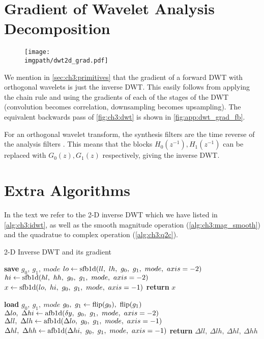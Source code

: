 \section{Gradient of Wavelet Analysis Decomposition}\label{sec:app:analysis_gradient}
\begin{figure}
  \centering
  \texttt{[image: \\imgpath/dwt2d\_grad.pdf]}
  \label{fig:app:dwt_grad_fb}
\end{figure}
We mention in \autoref{sec:ch3:primitives} that the gradient of a forward DWT with
orthogonal wavelets is just the inverse DWT. 
This easily follows from applying the chain rule and using the gradients of each of the
stages of the DWT (convolution becomes correlation, downsampling becomes
upsampling). The equivalent backwards pass of \autoref{fig:ch3:dwt} is
shown in \autoref{fig:app:dwt_grad_fb}.

For an orthogonal wavelet transform, the synthesis filters are the time reverse of
the analysis filters \cite[Chapter 3]{vetterli_wavelets_2007}. This means that
the blocks $H_0(z^{-1}), H_1(z^{-1})$ can be replaced with $G_0(z), G_1(z)$
respectively, giving the inverse DWT.

\section{Extra Algorithms}
In the text we refer to the 2-D inverse DWT which we have listed in
\autoref{alg:ch3:idwt}, as well as the smooth magnitude operation
(\autoref{alg:ch3:mag_smooth}) and the quadratue to complex operation
(\autoref{alg:ch3:q2c}).

\begin{algorithm}[h!]
\caption{2-D Inverse DWT and its gradient}\label{alg:ch3:idwt}
\begin{algorithmic}[1]
  \State \textbf{save} $g_0,\ g_1,\ mode$  \label{line:ch3:idwt_save}
  \State $lo \gets \F{sfb1d}(ll,\ lh,\ g_0,\ g_1,\ mode,\ axis=-2) $
  \State $hi \gets \F{sfb1d}(hl,\ hh,\ g_0,\ g_1,\ mode,\ axis=-2) $
  \State $x \gets \mathrm{sfb1d}(lo,\ hi,\ g_0,\ g_1,\ mode,\ axis=-1) $
  \State \textbf{return} $x$
\EndFunction
\end{algorithmic}\vspace{10pt}
\begin{algorithmic}[1]
  \State \textbf{load} $g_0,\ g_1,\ mode$
  \State $ g_0,\ g_1 \gets \F{flip}(g_0),\ \F{flip}(g_1) $
  \State $\Delta lo,\ \Delta hi \gets \mathrm{afb1d}(\delta y,\ g_0,\ g_1,\ mode,\ axis=-2)$ 
  \State $\Delta ll,\ \Delta lh \gets \F{afb1d}(\Delta lo,\ g_0,\ g_1,\ mode,\ axis=-1)$ 
  \State $\Delta hl,\ \Delta hh \gets \F{afb1d}(\Delta hi,\ g_0,\ g_1,\ mode,\ axis=-1)$ 
  \State \textbf{return} $\Delta ll,\ \Delta lh,\ \Delta hl,\ \Delta hh$
\EndFunction
\end{algorithmic}
\end{algorithm}

